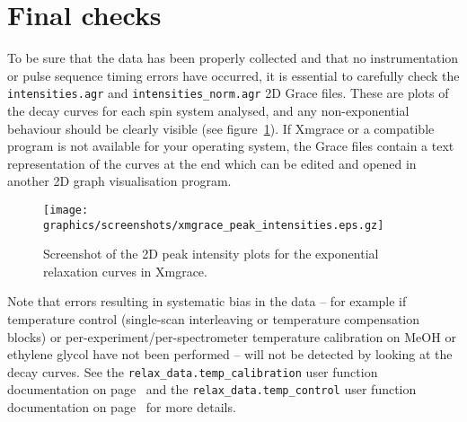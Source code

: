 
\section{Final checks}

To be sure that the data has been properly collected and that no instrumentation or pulse sequence timing errors have occurred, it is essential to carefully check the \texttt{intensities.agr} and \texttt{intensities\_norm.agr} 2D Grace files.  These are plots of the decay curves for each spin system analysed, and any non-exponential behaviour should be clearly visible (see figure~\ref{fig: screenshot: xmgrace peak intensities}).  If Xmgrace or a compatible program is not available for your operating system, the Grace files contain a text representation of the curves at the end which can be edited and opened in another 2D graph visualisation program.
 
\begin{figure}
\centerline{\texttt{[image: graphics/screenshots/xmgrace\_peak\_intensities.eps.gz]}}
\caption[Peak intensity 2D plot xmgrace screenshot]{Screenshot of the 2D peak intensity plots for the exponential relaxation curves in Xmgrace.}\label{fig: screenshot: xmgrace peak intensities}
\end{figure}

Note that errors resulting in systematic bias in the data -- for example if temperature control (single-scan interleaving or temperature compensation blocks) or per-experiment/per-spectrometer temperature calibration on MeOH or ethylene glycol have not been performed -- will not be detected by looking at the decay curves.  See the \texttt{relax\_data.temp\_calibration} user function documentation on page~\pageref{uf: relax_data.temp_calibration} and the \texttt{relax\_data.temp\_control} user function documentation on page~\pageref{uf: relax_data.temp_control} for more details.
